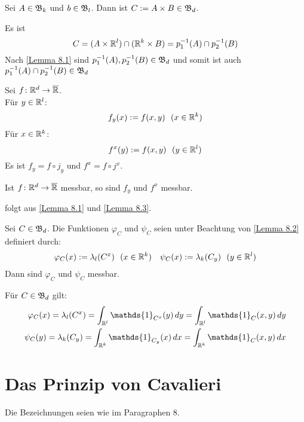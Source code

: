 \documentclass[a4paper,twoside,DIV15,BCOR12mm,chapterprefix=true,headings=onelinechapter]{scrbook}
\begin{document}
\begin{lemma}
\label{Lemma 8.3}
Sei \(A\in\mathfrak{B}_k\) und \(b\in\mathfrak{B}_l\). Dann ist \(C:=A\times B\in\mathfrak{B}_d\).
\end{lemma}

\begin{beweis}
Es ist
\[C=(A\times\mathbb{R}^l)\cap(\mathbb{R}^k\times B) = p_1^{-1}(A)\cap p_2^{-1}(B)\]
Nach \ref{Lemma 8.1} sind \(p_1^{-1}(A), p_2^{-1}(B) \in\mathfrak{B}_d\) und somit ist auch \(p_1^{-1}(A)\cap p_2^{-1}(B) \in\mathfrak{B}_d\)
\end{beweis}

\begin{definition}
Sei \(f\colon\mathbb{R}^d\to\overline{\mathbb{R}}\). \\
Für \(y\in\mathbb{R}^l\): \[f_y(x):=f(x,y) \ \ (x\in\mathbb{R}^k)\]
Für \(x\in\mathbb{R}^k\): \[f^x(y):=f(x,y) \ \ (y\in\mathbb{R}^l)\]
Es ist \(f_y=f\circ j_y\) und \(f^x=f\circ j^x\).
\end{definition}

\begin{lemma}
\label{Lemma 8.4}
Ist \(f\colon\mathbb{R}^d\to\overline{\mathbb{R}}\) messbar, so sind \(f_y\) und \(f^x\) messbar.
\end{lemma}

\begin{beweis}
folgt aus \ref{Lemma 8.1} und \ref{Lemma 8.3}.
\end{beweis}

\begin{defusatz} 
\label{Satz 8.5}
Sei \(C\in\mathfrak{B}_d\). Die Funktionen \(\varphi_C\) und \(\psi_C\) seien unter Beachtung von \ref{Lemma 8.2} definiert durch:
\begin{align*}
\varphi_C(x):=\lambda_l(C^x) \ \ (x\in\mathbb{R}^k) & & \psi_C(x):=\lambda_k(C_y) \ \ (y\in\mathbb{R}^l) 
\end{align*}
Dann sind \(\varphi_C\) und \(\psi_C\) messbar.
\end{defusatz}


\begin{bemerkung}
Für \(C\in\mathfrak{B}_d\) gilt:
\begin{align*}
\varphi_C(x)=\lambda_l(C^x)=\int_{\mdr^l}\mathds{1}_{C^x}(y)\,dy=\int_{\mdr^l}\mathds{1}_{C}(x,y)\,dy \\
\psi_C(y)=\lambda_k(C_y)=\int_{\mdr^k}\mathds{1}_{C_y}(x)\,dx=\int_{\mdr^k}\mathds{1}_{C}(x,y)\,dx
\end{align*}
\end{bemerkung}


\chapter{Das Prinzip von Cavalieri}
Die Bezeichnungen seien wie im Paragraphen 8.
\end{document}
